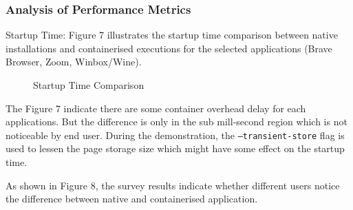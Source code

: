 \documentclass[journal,onecolumn]{IEEEtran}
\newcommand{\code}[1]{\texttt{#1}}
\begin{document}
\subsubsection{Analysis of Performance Metrics}
Startup Time: Figure 7 illustrates the startup time comparison between native installations and containerised executions for the selected applications (Brave Browser, Zoom, Winbox/Wine).
\begin{figure}[ht!]
    \centering
    \hfill
    \hfill
    \caption{Startup Time Comparison}
\end{figure}

The Figure 7 indicate there are some container overhead delay for each applications. But the difference is only in the sub mill-second region which is not noticeable by end user. During the demonstration, the \code{--transient-store} flag is used to lessen the page storage size which might have some effect on the startup time.

As shown in Figure 8, the survey results indicate whether different users notice the difference between native and containerised application.
\end{document}
